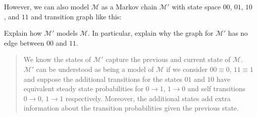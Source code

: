 \documentclass[letter]{article}
\begin{document}
\begin{enumerate}
\begin{enumerate}
					\begin{center}
			\end{center}
		However, we can also model $\mathcal M$ as a Markov chain $\mathcal M'$
		with state space $00$, $01$, $10$, and $11$ and transition graph like this:
		\begin{center}
    	\end{center}
		Explain how $\mathcal M'$ models $\mathcal M$. In particular, explain why the graph for $\mathcal M'$ has no edge between $00$ and $11$.
        \begin{quote}
            We know the states of $\mathcal M'$ capture the previous and current state of $\mathcal M$. $\mathcal M'$ can be understood as being a model of $\mathcal M$ if we consider $00 \equiv 0$, $11 \equiv 1$ and suppose the additional transitions for the states $01$ and $10$ have equivalent steady state probabilities for $0 \to 1$, $1 \to 0$ and self transitions $0 \to 0$, $1 \to 1$ respectively. Moreover, the additional states add extra information about the transition probabilities given the previous state.
            

\end{quote}
\end{enumerate}
\end{enumerate}
\end{document}
